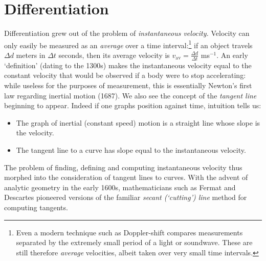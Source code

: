 \graphicspath{{3diff/asy/}}

\section{Differentiation}

Differentiation grew out of the problem of \emph{instantaneous velocity.} Velocity can only easily be measured as an \emph{average} over a time interval:\footnote{%
	Even a modern technique such as Doppler-shift compares measurements separated by the extremely small period of a light or soundwave. These are still therefore \emph{average} velocities, albeit taken over very small time intervals.%
}
if an object travels $\Delta d$ meters in $\Delta t$ seconds, then its average velocity is $v_\text{av}=\frac{\Delta d}{\Delta t}$ ms$^{-1}$. An early `definition' (dating to the 1300s) makes the instantaneous velocity equal to the constant velocity that would be observed if a body were to stop accelerating: while useless for the purposes of measurement, this is essentially Newton's first law regarding inertial motion (1687). We also see the concept of the \emph{tangent line} beginning to appear. Indeed if one graphs position against time, intuition tells us:
\begin{itemize}
  \item The graph of inertial (constant speed) motion is a straight line whose slope is the velocity.
  \item The tangent line to a curve has slope equal to the instantaneous velocity. 
\end{itemize}
The problem of finding, defining and computing instantaneous velocity thus morphed into the consideration of tangent lines to curves. With the advent of analytic geometry in the early 1600s, mathematicians such as Fermat and Descartes pioneered versions of the familiar \emph{secant (`cutting') line} method for computing tangents.

